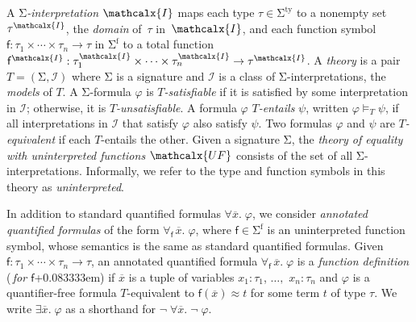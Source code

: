 \documentclass[runningheads,a4paper]{llncs}
\renewcommand\models{\mathrel{\vDash}}
\newcommand{\con}[1]{\mathsf{#1}}
\let\const=\con
\renewcommand\vec[1]{\overline{#1}}
\let\oldSigma=\Sigma
\def\Sigma{\mathrm{\oldSigma}}
\let\oldneg=\neg
\def\neg{\oldneg\;}
\newcommand{\teq}{\approx}
\newcommand{\I}{\mathcalx{I}}
\newcommand{\stypes}[1]{#1^\mathrm{ty}}
\newcommand{\sfuns}[1]{#1^\mathrm{f}}
\newcommand{\sfundefs}[1]{#1^\mathrm{dfn}}
\newcommand{\forallf}[1]{\forall_{\!#1\:}}
\newcommand{\rem}[1]{\textcolor{red}{[#1]}}
\newcommand{\ct}[1]{\rem{#1 --ct}}
\newcommand{\vthinspace}{\kern+0.083333em}
\newcommand{\Mo}{{\mathcal{I}}}
\newcommand{\euf}{\ensuremath{\mathcalx{UF}}\xspace}
\begin{document}

A \emph{$\Sigma$-interpretation $\I$} %
maps each type $\tau \in \stypes{\Sigma}$ to a nonempty set $\tau^\I$,
the \emph{domain} of~$\tau$ in~$\I$,
and each function symbol $\con{f} : \tau_1 \times \cdots \times \tau_n \rightarrow \tau$ in
$\sfuns{\Sigma}$
to a total function $\con{f}^\I : \tau_1^\I \times \cdots \times \tau_n^\I \rightarrow \tau^\I$.
A \emph{theory} is a pair $T = (\Sigma, \Mo)$ where
$\Sigma$ is a signature and $\Mo$ is a class of $\Sigma$-interpretations,
the \emph{models} of $T$.
A $\Sigma$-formula $\varphi$ is
\emph{$T$-satisfiable}
if it is satisfied by some interpretation in $\Mo$;
otherwise, it is \emph{$T$-unsatisfiable}.
A formula $\varphi$ \emph{$T$-entails} $\psi$, written $\varphi \models_T \psi$,
if all interpretations in $\Mo$ that satisfy $\varphi$ also satisfy $\psi$.
Two formulas $\varphi$ and $\psi$ are \emph{$T$-equivalent} 
if each $T$-entails the other.
Given a signature $\Sigma$,
the \emph{theory of equality with uninterpreted functions} \euf
consists of the set of all $\Sigma$-interpretations.
Informally, we refer to the type and function symbols in this theory as \emph{uninterpreted}.

In addition to standard quantified formulas $\forall \vec x.\; \varphi$,
we consider \emph{annotated quantified formulas} of the form
$\forallf{\const{f}} \vec x.\; \varphi$, where $\con{f} \in \sfuns{\Sigma}$ is
an uninterpreted function symbol, 
whose semantics is the same as standard quantified formulas.
Given $\con{f} : \tau_1 \times \cdots \times \tau_n \rightarrow \tau$,
an annotated
quantified formula $\forallf{\con{f}} \vec x.\; \varphi$ is a \emph{function definition}
(\,\emph{for $\con{f}$}\vthinspace) if $\vec x$ is a tuple of variables
$x_1 : \tau_1$, $\ldots,$ $x_n : \tau_n$
and $\varphi$ is a quantifier-free formula 
$T$-equivalent to $\con{f}( \vec x ) \teq t$ for some term $t$ of type $\tau$.
We write $\exists
\vec x.\; \varphi$ as a shorthand for $\neg \forall \vec x.\; \neg \varphi$.
\end{document}
